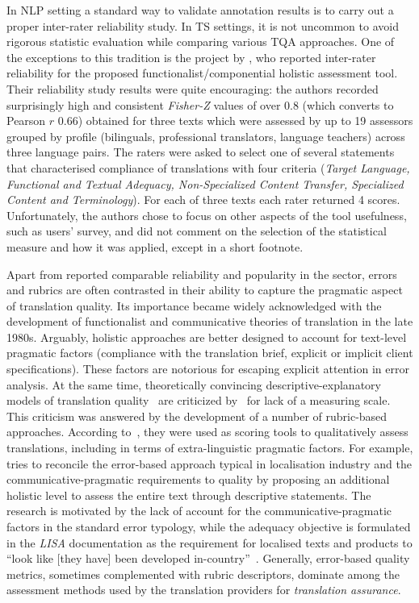 In NLP setting a standard way to validate annotation results is to carry out a proper inter-rater reliability study. In TS settings, it is not uncommon to avoid rigorous statistic evaluation while comparing various TQA approaches. One of the exceptions to this tradition is the project by \citet{Colina2008}, who reported inter-rater reliability for the proposed functionalist/componential holistic assessment tool. Their reliability study results were quite encouraging: the authors recorded surprisingly high and consistent \textit{Fisher-Z} values of over 0.8 (which converts to Pearson $r$ 0.66) obtained for three texts which were assessed by up to 19 assessors grouped by profile (bilinguals, professional translators, language teachers) across three language pairs. The raters were asked to select one of several statements that characterised compliance of translations with four criteria (\textit{Target Language, Functional and Textual Adequacy, Non-Specialized Content Transfer, Specialized Content and Terminology}). For each of three texts each rater returned 4 scores. Unfortunately, the authors chose to focus on other aspects of the tool usefulness, such as users' survey, and did not comment on the selection of the statistical measure and how it was applied, except in a short footnote. 

Apart from reported comparable reliability and popularity in the sector, errors and rubrics are often contrasted in their ability to capture the pragmatic aspect of translation quality. Its importance became widely acknowledged with the development of functionalist and communicative theories of translation in the late 1980s. Arguably, holistic approaches are better designed to account for text-level pragmatic factors (compliance with the translation brief, explicit or implicit client specifications). These factors are notorious for escaping explicit attention in error analysis. At the same time, theoretically convincing descriptive-explanatory models of translation quality~\cite{Nord2006,House2001} are criticized by~\citet{Williams2001} for lack of a measuring scale. This criticism was answered by the development of a number of rubric-based approaches. According to~\citet{Hegrenaes2020}, they were used as scoring tools to qualitatively assess translations, including in terms of extra-linguistic pragmatic factors. 
For example, \citet{JimenezCrespo2009} tries to reconcile the error-based approach typical in localisation industry and the communicative-pragmatic requirements to quality by proposing an additional holistic level to assess the entire text through descriptive statements. The research is motivated by the lack of account for the communicative-pragmatic factors in the standard error typology, while the adequacy objective is formulated in the \textit{LISA} documentation as the requirement for localised texts and products to ``look like [they have] been developed in-country''~\cite[p.11]{LISA2004}. Generally, error-based quality metrics, sometimes complemented with rubric descriptors, dominate among the assessment methods used by the translation providers for \textit{translation assurance}. 

